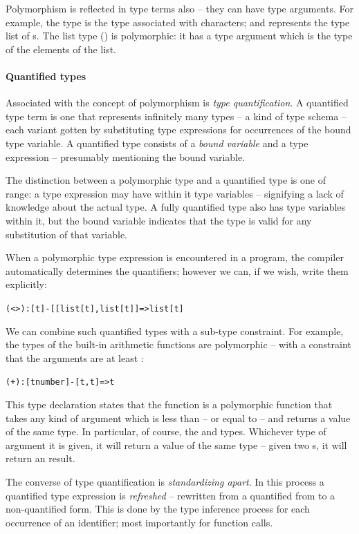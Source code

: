 Polymorphism is reflected in type terms also -- they can have type arguments. For example, the  type is the type associated with characters; and  represents the type list  of s. The list type () is polymorphic: it has a type argument which is the type of the elements of the list.

\paragraph{Quantified types}
\label{type:quantification}
Associated with the concept of polymorphism is \emph{type quantification}. 
A quantified type term is one that represents infinitely many types -- a kind of type schema -- each variant gotten by substituting type expressions for occurrences of the bound type variable. A quantified type consists of a \emph{bound variable} and a type expression -- presumably mentioning the bound variable. 

The distinction between a polymorphic type and a quantified type is one of range: a type expression may have within it type variables -- signifying a lack of knowledge about the actual type. A fully quantified type also has type variables within it, but the bound variable indicates that the type is valid for any substitution of that variable.

When a polymorphic type expression is encountered in a program, the \go compiler  automatically determines the quantifiers; however we can, if we wish, write them explicitly:
\begin{alltt}
(<>):[t]-[[list[t],list[t]]=>list[t]
\end{alltt}

We can combine such quantified types with a sub-type constraint. For example, the types of the built-in arithmetic functions are polymorphic -- with a constraint that the arguments are at least :
\begin{alltt}
(+):[t\typearrow number]-[t,t]=>t
\end{alltt}
This type declaration states that the \q{+} function is a polymorphic function that takes any kind of argument which is less than -- or equal to --  and returns a value of the same type. In particular, of course, the  and  types. Whichever type of argument it is given, it will return a value of the same type -- given two s, it will return an  result.

The converse of type quantification is \emph{standardizing apart}. In this process a quantified type expression is \emph{refreshed} -- rewritten from a quantified from to a non-quantified form. This is done by the type inference process for each occurrence of an identifier; most importantly for function calls.

